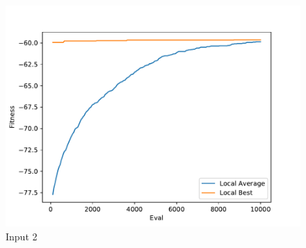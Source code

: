 \documentclass{standalone}
\begin{document}
\begin{figure}[!htb]
	\caption{Input 2}
	\label{fig:graph_2011}
	\includegraphics[width=\textwidth]{../graphs/graphs/2011.pdf}
\end{figure}
\end{document}

